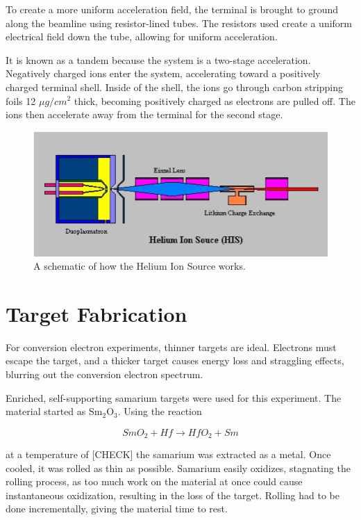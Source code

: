 To create a more uniform acceleration field, the terminal is brought to ground along the beamline using resistor-lined tubes. The resistors used create a uniform electrical field down the tube, allowing for uniform acceleration.

It is known as a tandem because the system is a two-stage acceleration. Negatively charged ions enter the system, accelerating toward a positively charged terminal shell. Inside of the shell, the ions go through carbon stripping foils 12 $\mu g/cm^2$ thick, becoming positively charged as electrons are pulled off. The ions then accelerate away from the terminal for the second stage.

\begin{figure}
    \centering
    \includegraphics[scale=0.5]{Setup_Figs/HIS.png}
    \caption{A schematic of how the Helium Ion Source works.}
    \label{fig:HIS}
\end{figure}

\section{Target Fabrication}

For conversion electron experiments, thinner targets are ideal. Electrons must escape the target, and a thicker target causes energy loss and straggling effects, blurring out the conversion electron spectrum.

Enriched, self-supporting samarium targets were used for this experiment. The material started as Sm$_2$O$_3$. Using the reaction

\begin{equation}
    SmO_2 + Hf \xrightarrow{} HfO_2 + Sm
    \label{eq:sm_hf}
\end{equation}

at a temperature of [CHECK] the samarium was extracted as a metal. Once cooled, it was rolled as thin as possible. Samarium easily oxidizes, stagnating the rolling process, as too much work on the material at once could cause instantaneous oxidization, resulting in the loss of the target. Rolling had to be done incrementally, giving the material time to rest.

